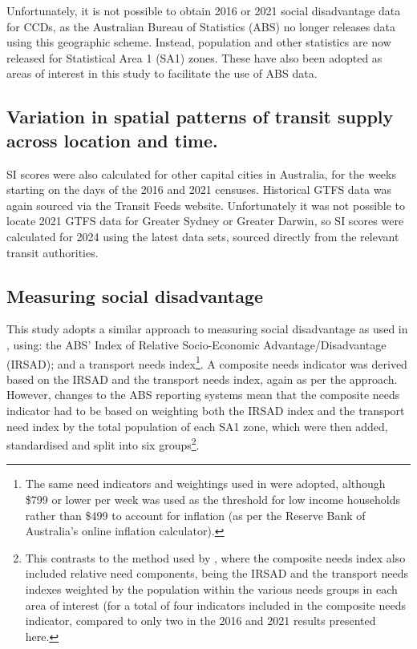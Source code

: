 \documentclass[preprint, 3p,
authoryear]{elsarticle} %
\begin{document}
Unfortunately, it is not possible to obtain 2016 or 2021 social
disadvantage data for CCDs, as the Australian Bureau of Statistics (ABS)
no longer releases data using this geographic scheme. Instead,
population and other statistics are now released for Statistical Area 1
(SA1) zones. These have also been adopted as areas of interest in this
study to facilitate the use of ABS data.

\hypertarget{variation-in-spatial-patterns-of-transit-supply-across-location-and-time.}{%
\subsection{Variation in spatial patterns of transit supply across
location and
time.}\label{variation-in-spatial-patterns-of-transit-supply-across-location-and-time.}}

SI scores were also calculated for other capital cities in Australia,
for the weeks starting on the days of the 2016 and 2021 censuses.
Historical GTFS data was again sourced via the Transit Feeds website.
Unfortunately it was not possible to locate 2021 GTFS data for Greater
Sydney or Greater Darwin, so SI scores were calculated for 2024 using
the latest data sets, sourced directly from the relevant transit
authorities.

\hypertarget{measuring-social-disadvantage}{%
\subsection{Measuring social
disadvantage}\label{measuring-social-disadvantage}}

This study adopts a similar approach to measuring social disadvantage as
used in \citet{currie2010identifying}, using: the ABS' Index of Relative
Socio-Economic Advantage/Disadvantage (IRSAD); and a transport needs
index\footnote{The same need indicators and weightings used in
  \citet{currie2010identifying} were adopted, although \$799 or lower
  per week was used as the threshold for low income households rather
  than \$499 to account for inflation (as per the Reserve Bank of
  Australia's online inflation calculator).}. A composite needs
indicator was derived based on the IRSAD and the transport needs index,
again as per the \citet{currie2010identifying} approach. However,
changes to the ABS reporting systems mean that the composite needs
indicator had to be based on weighting both the IRSAD index and the
transport need index by the total population of each SA1 zone, which
were then added, standardised and split into six groups\footnote{This
  contrasts to the method used by \citet{currie2010identifying}, where
  the composite needs index also included relative need components,
  being the IRSAD and the transport needs indexes weighted by the
  population within the various needs groups in each area of interest
  (for a total of four indicators included in the composite needs
  indicator, compared to only two in the 2016 and 2021 results presented
  here.}.
\end{document}
